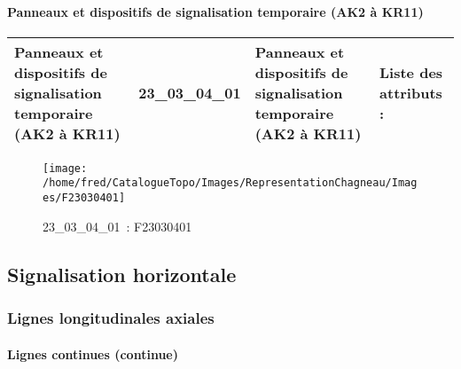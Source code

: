 \documentclass[12pt,titlepage,oneside]{book}
\begin{document}
\paragraph{Panneaux et dispositifs de signalisation temporaire (AK2 à KR11)}
\noindent
\vspace{\baselineskip}

\renewcommand{\arraystretch}{1.2}
\begin{supertabular}{|p{10cm}|c|p{13cm}|p{12cm}|}
 Panneaux et dispositifs de signalisation temporaire (AK2 à KR11) & 23\_03\_04\_01 & Panneaux et dispositifs de signalisation temporaire (AK2 à KR11) & Liste des attributs :
\begin{enumerate}
\end{enumerate}
\\
\hline
\end{supertabular}
\begin{figure}[h!]
  \hfill         %
  \begin{minipage}[t]{3cm}
    \begin{center}
      \texttt{[image: /home/fred/CatalogueTopo/Images/RepresentationChagneau/Images/F23030401]}
      \caption[~23\_03\_04\_01]{\small{23\_03\_04\_01~:} \tiny{F23030401}}\label{F23030401}
    \end{center}
  \end{minipage}
\end{figure}
\subsection{Signalisation horizontale}
\subsubsection{\large Lignes longitudinales axiales}
\paragraph{Lignes continues (continue)}
\noindent
\vspace{\baselineskip}
\end{document}
